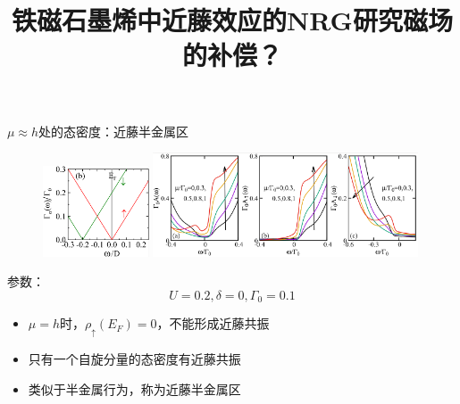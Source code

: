 \documentclass[9pt,t]{beamer} %
\begin{document}
\title{铁磁石墨烯中近藤效应的NRG研究\qquad \qquad \qquad \qquad 磁场的补偿？}
\begin{frame}{$\mu\approx h$处的态密度：近藤半金属区}
\begin{figure}
\includegraphics[width=0.28\textwidth,height=0.27\textwidth]{hyb2.png}
\includegraphics[width=0.7\textwidth]{dos-mu=h.png}
\end{figure}
参数：
\[U=0.2,\delta=0,\Gamma_{0}=0.1\]
\begin{itemize}
\vspace{0.3cm}
\setlength\itemsep{0.5em}
\item $\mu=h$时，$\rho_{\uparrow}(E_{F})=0$，不能形成近藤共振
\item 只有一个自旋分量的态密度有近藤共振
\item 类似于半金属行为，称为近藤半金属区
\end{itemize}
\end{frame}
\end{document}
